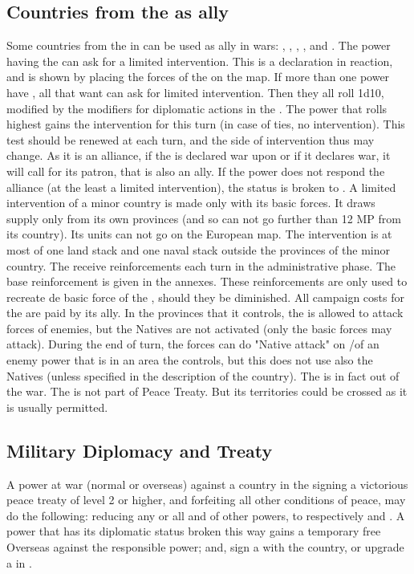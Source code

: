 \subsection{Countries from the \ROTW as ally}
\aparag Some countries from the \ROTW in \dipAT can be used as ally in
wars: , , , ,
 and .  The power having the \dipAT can
ask for a limited intervention.  This is a declaration in reaction, and
is shown by placing the forces of the \MIN on the map.
\bparag If more than one power have \dipAT, all that want can ask for
limited intervention. Then they all roll 1d10, modified by the modifiers
for diplomatic actions in the \ROTW. The power that rolls highest gains
the intervention for this turn (in case of ties, no intervention). This
test should be renewed at each turn, and the side of intervention thus
may change.
 As it is an alliance, if the \MIN is declared war
upon or if it declares war, it will call for its patron, that is also an
ally. If the power does not respond the alliance (at the least a
limited intervention), the status is broken to \dipFR. 
\bparag A limited intervention of a minor country is made only with its
basic forces. It draws supply only from its own provinces (and so can
not go further than 12 MP from its country). Its units can not go on the
European map.
\bparag The intervention is at most of one land stack and one
naval stack outside the provinces of the minor country. 
\bparag The \MIN receive reinforcements each turn in the administrative
phase. The base reinforcement is given in the annexes. These
reinforcements are only used to recreate de basic force of the \MIN,
should they be diminished.
\bparag All campaign costs for the \MIN are paid by its ally.
\bparag In the provinces that it controls, the \MIN is allowed to attack
forces of enemies, but the Natives are not activated (only the basic
forces may attack). During the end of turn, the forces can do "Native
attack" on \TP/\COL of an enemy power that is in an area the \MIN
controls, but this does not use also the Natives (unless specified in
the description of the country).
\bparag The \MIN is in fact out of the war. The \MIN is not part of
Peace Treaty.  But its territories could be crossed as it is usually
permitted.

\subsection{Military Diplomacy and  Treaty}
\aparag A power at war (normal or overseas) against a country in the
\ROTW signing a
victorious peace treaty of level 2 or higher, and forfeiting all other
conditions of peace, may do the following:
\bparag reducing any or all \dipAT and \dipFR of other powers,
to respectively \dipFR and \dipNR.
A power that has its diplomatic status broken this way gains a temporary
free Overseas \CB against the responsible power;
\bparag and, sign a \dipFR with the \ROTW country, or
upgrade a \dipFR in \dipAT.
 
